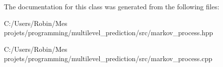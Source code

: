 The documentation for this class was generated from the following files\+:\begin{DoxyCompactItemize}
\item 
C\+:/\+Users/\+Robin/\+Mes projets/programming/multilevel\+\_\+prediction/src/markov\+\_\+process.\+hpp\item 
C\+:/\+Users/\+Robin/\+Mes projets/programming/multilevel\+\_\+prediction/src/markov\+\_\+process.\+cpp\end{DoxyCompactItemize}

